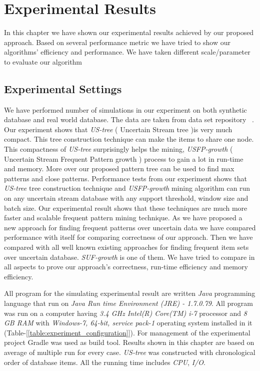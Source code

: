 %
\chapter{Experimental Results}
In this chapter we have shown our experimental results achieved by our proposed approach. Based on several performance metric we have tried to show our algorithms' efficiency and performance. We have taken different scale/parameter to evaluate our algorithm


\section{Experimental Settings}
We have performed number of simulations in our experiment on both synthetic database and real world database. The data are taken from data set repository ~\cite{dataset}. Our experiment shows that \emph{US-tree} ( Uncertain Stream tree )is very much compact. This tree construction technique can make the items to share one node. This compactness of \emph{US-tree} surprisingly helps the mining, \emph{USFP-growth} ( Uncertain Stream Frequent Pattern growth ) process to gain a lot in run-time and memory. More over our proposed pattern tree can be used to find max patterns and close patterns. Performance tests from our experiment shows that \emph{US-tree} tree construction technique and \emph{USFP-growth} mining algorithm can run on any uncertain stream database with any support threshold, window size and batch size. Our experimental result shows that these techniques are much more faster and scalable frequent pattern mining technique. As we have proposed a new approach for finding frequent patterns over uncertain data we have compared performance with itself for comparing correctness of our approach. Then we have compared with all well known existing approaches for finding frequent item sets over uncertain database. \emph{SUF-growth} is one of them. We have tried to compare in all aspects to prove our approach's correctness, run-time efficiency and memory efficiency.

All program for the simulating experimental result are written \emph{Java} programming language that run on \emph{Java Run time Environment (JRE) - 1.7.0.79}. All program was run on a computer having \emph{3.4 GHz Intel(R) Core(TM) i-7} processor and \emph{8 GB RAM} with \emph{Windows-7, 64-bit, service pack-1} operating system installed in it (Table-[\ref{table:experiment_configuration}]). For management of the experimental project Gradle was used as build tool. Results shown in this chapter are based on average of multiple run for every case. \emph{US-tree} was constructed with chronological order of database items. All the running time includes \emph{CPU}, \emph{I/O}.\\
